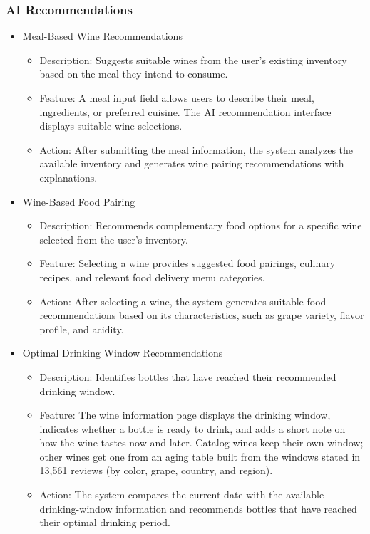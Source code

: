 \documentclass[conference]{IEEEtran}
\begin{document}
\subsubsection{AI Recommendations}
\begin{itemize}
    \item Meal-Based Wine Recommendations
    \begin{itemize}
        \item Description: Suggests suitable wines from the user's existing inventory based on the meal they intend to consume.
        \item Feature: A meal input field allows users to describe their meal, ingredients, or preferred cuisine. The AI recommendation interface displays suitable wine selections.
        \item Action: After submitting the meal information, the system analyzes the available inventory and generates wine pairing recommendations with explanations.
    \end{itemize}

    \item Wine-Based Food Pairing
    \begin{itemize}
        \item Description: Recommends complementary food options for a specific wine selected from the user's inventory.
        \item Feature: Selecting a wine provides suggested food pairings, culinary recipes, and relevant food delivery menu categories.
        \item Action: After selecting a wine, the system generates suitable food recommendations based on its characteristics, such as grape variety, flavor profile, and acidity.
    \end{itemize}

    \item Optimal Drinking Window Recommendations
    \begin{itemize}
        \item Description: Identifies bottles that have reached their recommended drinking window.
        \item Feature: The wine information page displays the drinking window, indicates whether a bottle is ready to drink, and adds a short note on how the wine tastes now and later. Catalog wines keep their own window; other wines get one from an aging table built from the windows stated in 13,561 reviews (by color, grape, country, and region).
        \item Action: The system compares the current date with the available drinking-window information and recommends bottles that have reached their optimal drinking period.
    \end{itemize}


\end{itemize}
\end{document}
